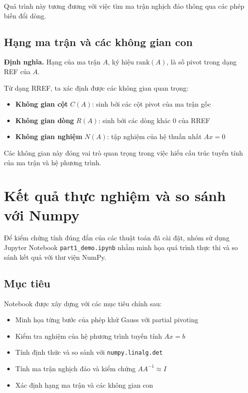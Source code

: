 Quá trình này tương đương với việc tìm ma trận nghịch đảo thông qua các phép biến đổi dòng.

\subsection{Hạng ma trận và các không gian con}

\textbf{Định nghĩa.} Hạng của ma trận $A$, ký hiệu $\mathrm{rank}(A)$, là số pivot trong dạng REF của $A$.

\medskip

Từ dạng RREF, ta xác định được các không gian quan trọng:

\begin{itemize}[topsep=0pt, itemsep=2.5pt, leftmargin=1.5cm]
    \item \textbf{Không gian cột} $C(A)$: sinh bởi các cột pivot của ma trận gốc
    \item \textbf{Không gian dòng} $R(A)$: sinh bởi các dòng khác 0 của RREF
    \item \textbf{Không gian nghiệm} $N(A)$: tập nghiệm của hệ thuần nhất $Ax = 0$
\end{itemize}

Các không gian này đóng vai trò quan trọng trong việc hiểu cấu trúc tuyến tính của ma trận và hệ phương trình.

\section{Kết quả thực nghiệm và so sánh với Numpy}

Để kiểm chứng tính đúng đắn của các thuật toán đã cài đặt, nhóm sử dụng Jupyter Notebook \texttt{part1\_demo.ipynb} nhằm minh họa quá trình thực thi và so sánh kết quả với thư viện NumPy.

\subsection{Mục tiêu}

Notebook được xây dựng với các mục tiêu chính sau:

\begin{itemize}[topsep=0pt, itemsep=2.5pt, leftmargin=1.5cm]
    \item Minh họa từng bước của phép khử Gauss với partial pivoting
    \item Kiểm tra nghiệm của hệ phương trình tuyến tính $Ax = b$
    \item Tính định thức và so sánh với \texttt{numpy.linalg.det}
    \item Tính ma trận nghịch đảo và kiểm chứng $AA^{-1} \approx I$
    \item Xác định hạng ma trận và các không gian con
\end{itemize}

